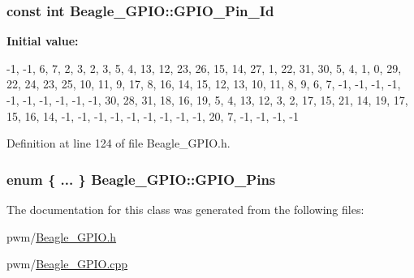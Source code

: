 \hypertarget{class_beagle___g_p_i_o_a9a48339b54de8e6c884ddad8629a3647}{
\subsubsection[{\-G\-P\-I\-O\-\_\-\-Pin\-\_\-\-Id}]{\setlength{\rightskip}{0pt plus 5cm}const int {\bf \-Beagle\-\_\-\-G\-P\-I\-O\-::\-G\-P\-I\-O\-\_\-\-Pin\-\_\-\-Id}}}\label{class_beagle___g_p_i_o_a9a48339b54de8e6c884ddad8629a3647}
{\bfseries \-Initial value\-:}
\begin{DoxyCode}
 
{
        -1, -1,  6,  7,  2,     
         3,  2,  3,  5,  4,     
        13, 12, 23, 26, 15,     
        14, 27,  1, 22, 31,     
        30,  5,  4,  1,  0,     
        29, 22, 24, 23, 25,     
        10, 11,  9, 17,  8,     
        16, 14, 15, 12, 13,     
        10, 11,  8,  9,  6,     
         7,                     
        -1, -1, -1, -1, -1,     
        -1, -1, -1, -1, -1,     
        30, 28, 31, 18, 16,     
        19,  5,  4, 13, 12,     
         3,  2, 17, 15, 21,     
        14, 19, 17, 15, 16,     
        14, -1, -1, -1, -1,     
        -1, -1, -1, -1, -1,     
        20,  7, -1, -1, -1,     
        -1                      
}
\end{DoxyCode}


\-Definition at line 124 of file \-Beagle\-\_\-\-G\-P\-I\-O.\-h.

\hypertarget{class_beagle___g_p_i_o_a0806cf8c44549ab348c5f82197e23d9e}{
\subsubsection[{\-G\-P\-I\-O\-\_\-\-Pins}]{\setlength{\rightskip}{0pt plus 5cm}enum \{ ... \}   {\bf \-Beagle\-\_\-\-G\-P\-I\-O\-::\-G\-P\-I\-O\-\_\-\-Pins}}}\label{class_beagle___g_p_i_o_a0806cf8c44549ab348c5f82197e23d9e}


\-The documentation for this class was generated from the following files\-:\begin{DoxyCompactItemize}
\item 
pwm/\hyperlink{_beagle___g_p_i_o_8h}{\-Beagle\-\_\-\-G\-P\-I\-O.\-h}\item 
pwm/\hyperlink{_beagle___g_p_i_o_8cpp}{\-Beagle\-\_\-\-G\-P\-I\-O.\-cpp}\end{DoxyCompactItemize}
